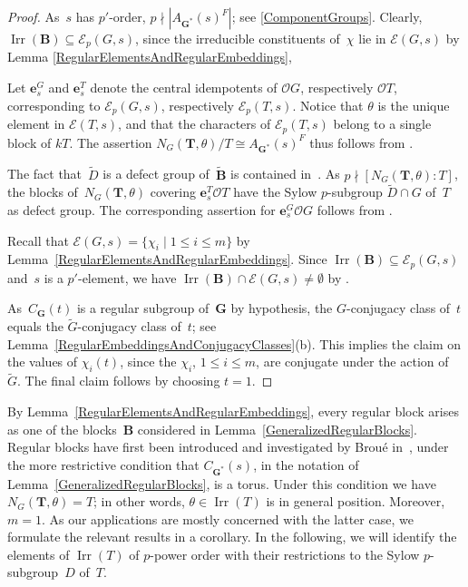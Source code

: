 \documentclass[12pt]{amsart}
\newcommand{\bG}{{\mathbf{G}}}      %
\newcommand{\bB}{{\mathbf{B}}}
\newcommand{\bT}{{\mathbf{T}}}
\DeclareMathOperator{\Irr}{Irr}
\theoremstyle{theorem}
\theoremstyle{definition}
\theoremstyle{remark}
\begin{document}
\begin{proof}
As~$s$ has $p'$-order, $p \nmid |A_{\bG^*}( s )^F|$; see \ref{ComponentGroups}.
Clearly, $\Irr( \bB ) \subseteq \mathcal{E}_p( G, s )$, since the irreducible 
constituents of~$\chi$ lie in $\mathcal{E}( G, s )$ by 
Lemma \ref{RegularElementsAndRegularEmbeddings},

Let $\mathbf{e}_s^G$ and $\mathbf{e}_s^T$ denote the central idempotents 
of $\mathcal{O}G$, respectively $\mathcal{O}T$, corresponding to
$\mathcal{E}_p( G, s )$, respectively $\mathcal{E}_p( T, s )$. Notice
that $\theta$ is the unique element in $\mathcal{E}( T, s )$, and that
the characters of $\mathcal{E}_p( T, s )$ belong to a single block of $kT$. 
The assertion $N_G( \bT, \theta )/T \cong A_{\bG^*}( s )^F$ thus follows from 
\cite[$(7.1)$]{BoDaRo}.

The fact that~$\tilde{D}$ is a defect group of~$\tilde{\bB}$ is contained 
in~\cite[Th{\'e}o\-r{\`e}\-me~$3.1$]{brouMo}.
As $p \nmid [N_G( \bT, \theta )\colon\!T]$, the blocks of~$N_G( \bT, \theta )$
covering $\mathbf{e}_s^T\mathcal{O}T$ have the Sylow $p$-subgroup 
$\tilde{D} \cap G$ of~$T$ as 
defect group. The corresponding assertion for $\mathbf{e}_s^G\mathcal{O}G$ 
follows from \cite[Theorem~$7.7$]{BoDaRo}.

Recall that $\mathcal{E}( G, s ) = \{ \chi_i \mid 1 \leq i \leq m \}$ by 
Lemma~\ref{RegularElementsAndRegularEmbeddings}.
Since $\Irr( \bB ) \subseteq \mathcal{E}_p( G, s )$ and~$s$ is a $p'$-element,
we have $\Irr( \bB ) \cap \mathcal{E}( G, s ) \neq \emptyset$ by 
\cite[Theorem~$3.1$]{gelfgraev}.

As~$C_{\bG}( t )$ is a 
regular subgroup of~$\bG$ by hypothesis, the $G$-conjugacy class of~$t$
equals the $\tilde{G}$-conjugacy class of~$t$; see 
Lemma~\ref{RegularEmbeddingsAndConjugacyClasses}(b). This implies the claim
on the values of $\chi_i(t)$, since the $\chi_i$, $1 \leq i \leq m$, are
conjugate under the action of~$\tilde{G}$. The final claim follows by choosing
$t = 1$.
\end{proof}

By Lemma~\ref{RegularElementsAndRegularEmbeddings}, every regular block arises
as one of the blocks~$\bB$ considered in Lemma~\ref{GeneralizedRegularBlocks}.
Regular blocks have first been introduced and investigated by Brou{\'e}
in~\cite{brouMo}, under the more restrictive condition that $C_{\bG^*}( s )$, in
the notation of Lemma~\ref{GeneralizedRegularBlocks}, is a torus. Under this 
condition we have $N_G( \bT, \theta ) = T$; in other words, 
$\theta \in \Irr( T )$ is in general position. Moreover, $m = 1$. As our 
applications are mostly concerned with the latter case, we formulate the
relevant results in a corollary. In the following, we will identify the
elements of $\Irr(T)$ of $p$-power order with their restrictions to
the Sylow $p$-subgroup~$D$ of~$T$.
\end{document}
